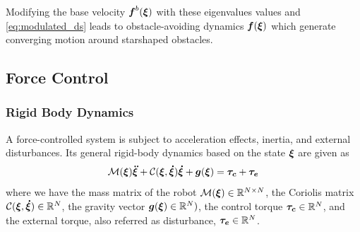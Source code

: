 Modifying the base velocity $\boldsymbol{f}^b(\boldsymbol{\xi})$ with these eigenvalues values and \eqref{eq:modulated_ds} leads to obstacle-avoiding dynamics $\boldsymbol{f}(\boldsymbol{\xi})$ which generate converging motion around starshaped obstacles.

\subsection{Force Control}

\subsubsection{Rigid Body Dynamics}
A force-controlled system is subject to acceleration effects, inertia, and external disturbances. Its general rigid-body dynamics based on the state $\boldsymbol{\xi}$ are given as
\begin{equation}
\matd{M}(\vecs\xi)\vecs{\ddot\xi} + \matd{C}(\vecs\xi, \vecs{\dot\xi})\vecs{\dot\xi} + \vect g(\vecs\xi) = \vecs{\tau_c} + \vecs{\tau_e}
 \label{eq:robot_dynamics}
\end{equation}
where we have the mass matrix of the robot $\mathcal{M}(\boldsymbol{\xi}) \in \mathbb{R}^{N \times N}$, the Coriolis matrix $\mathcal{C}(\boldsymbol{\xi},\boldsymbol{\dot\xi}) \in \mathbb{R}^N$, the gravity vector $\boldsymbol{g}(\boldsymbol{\xi}) \in \mathbb{R}^N)$, the control torque $\boldsymbol{\tau_c} \in \mathbb{R}^N$, and the external torque, also referred as disturbance, $\boldsymbol{\tau_e} \in \mathbb{R}^N$.

